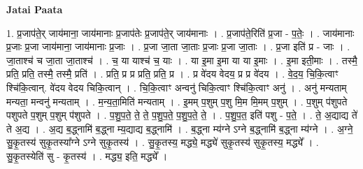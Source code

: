 \documentclass[17pt]{extarticle}
\begin{document}
\textbf{Jatai Paata} \newline

1. प्र॒जाप॑ते॒र् जाय॑माना॒ जाय॑मानाः प्र॒जाप॑तेः प्र॒जाप॑ते॒र् जाय॑मानाः । . प्र॒जाप॑ते॒रिति॑ प्र॒जा - प॒तेः॒ । . जाय॑मानाः प्र॒जाः प्र॒जा जाय॑माना॒ जाय॑मानाः प्र॒जाः । . प्र॒जा जा॒ता जा॒ताः प्र॒जाः प्र॒जा जा॒ताः । . प्र॒जा इति॑ प्र - जाः । . जा॒ताश्च॑ च जा॒ता जा॒ताश्च॑ । . च॒ या याश्च॑ च॒ याः । . या इ॒मा इ॒मा या या इ॒माः । . इ॒मा इती॒माः । . तस्मै॒ प्रति॒ प्रति॒ तस्मै॒ तस्मै॒ प्रति॑ । . प्रति॒ प्र प्र प्रति॒ प्रति॒ प्र । . प्र वे॑दय वेदय॒ प्र प्र वे॑दय । . वे॒द॒य॒ चि॒कि॒त्वाꣳ श्चि॑कि॒त्वान्. वे॑दय वेदय चिकि॒त्वान् । . चि॒कि॒त्वाꣳ अन्वनु॑ चिकि॒त्वाꣳ श्चि॑कि॒त्वाꣳ अनु॑ । . अनु॑ मन्यताम् मन्यता॒ मन्वनु॑ मन्यताम् । . म॒न्य॒ता॒मिति॑ मन्यताम् । . इ॒मम् प॒शुम् प॒शु मि॒म मि॒मम् प॒शुम् । . प॒शुम् प॑शुपते पशुपते प॒शुम् प॒शुम् प॑शुपते । . प॒शु॒प॒ते॒ ते॒ ते॒ प॒शु॒प॒ते॒ प॒शु॒प॒ते॒ ते॒ । . प॒शु॒प॒त॒ इति॑ पशु - प॒ते॒ । . ते॒ अ॒द्याद्य ते॑ ते अ॒द्य । . अ॒द्य ब॒द्ध्नामि॑ ब॒द्ध्ना म्य॒द्याद्य ब॒द्ध्नामि॑ । . ब॒द्ध्ना म्य॑ग्ने ऽग्ने ब॒द्ध्नामि॑ ब॒द्ध्ना म्य॑ग्ने । . अ॒ग्ने॒ सु॒कृ॒तस्य॑ सुकृ॒तस्या᳚ग्ने ऽग्ने सुकृ॒तस्य॑ । . सु॒कृ॒तस्य॒ मद्ध्ये॒ मद्ध्ये॑ सुकृ॒तस्य॑ सुकृ॒तस्य॒ मद्ध्ये᳚ । . सु॒कृ॒तस्येति॑ सु - कृ॒तस्य॑ । . मद्ध्य॒ इति॒ मद्ध्ये᳚ । \newline
\end{document}
